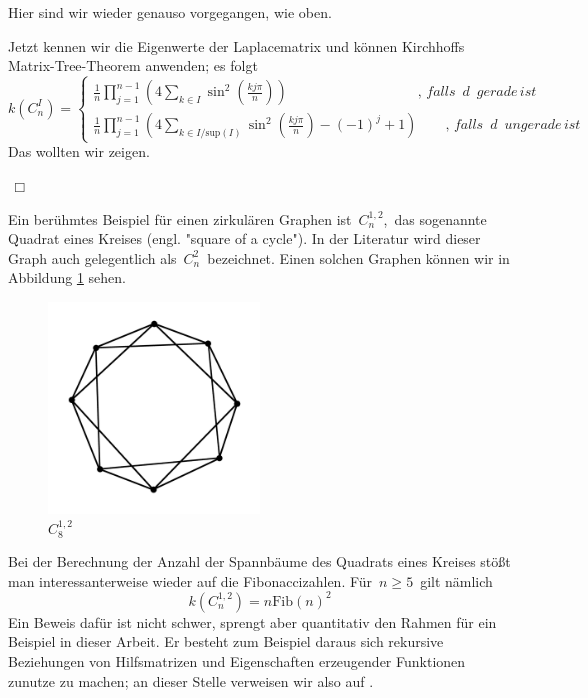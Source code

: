 \normalsize
Hier sind wir wieder genauso vorgegangen, wie oben.\\
\par
\endgroup
Jetzt kennen wir die Eigenwerte der Laplacematrix und können Kirchhoffs Matrix-Tree-Theorem anwenden; es folgt
\begin{equation*}
\mathit{k}\left( C_n^I \right) = 
 \begin{cases}
\frac{1}{n} \prod_{j=1}^{n-1} \left(4 \sum_{k \in I} \sin^2 \left( \frac{kj\pi}{n}\right) \right)\qquad\qquad\qquad\qquad\quad\; ,\,falls\,\,\,d\,\,\,gerade\,ist\\
\frac{1}{n} \prod_{j=1}^{n-1} \left(4 \sum_{k \in I/\mathrm{sup}(I)} \sin^2 \left( \frac{kj\pi}{n}\right)-(-1)^j+1\right)\qquad,\,falls\,\,\,d\,\,\,ungerade\,ist
\end{cases}
\end{equation*}
Das wollten wir zeigen.
\begin{flushright} $\,\Box\,$ \end{flushright} 
\begin{Bsps}
\end{Bsps}
Ein berühmtes Beispiel für einen zirkulären Graphen ist $\,C_n^{1,2}$,\, das sogenannte Quadrat eines Kreises (engl. "square of a cycle"). In der Literatur wird dieser Graph auch gelegentlich als $\,C_n^2\,$ bezeichnet. Einen solchen Graphen können wir in Abbildung \ref{c2_8} sehen.
\begin{figure}[H]
  \centering
 \includegraphics[width=0.5\textwidth]{c2_8.png}
 \caption{$C_8^{1,2}$}
 \label{c2_8} %
\end{figure}
Bei der Berechnung der Anzahl der Spannbäume des Quadrats eines Kreises stößt man interessanterweise wieder auf die Fibonaccizahlen. Für $\,n\geq5\,$ gilt nämlich
\begin{equation*}
 \mathit{k}\left(C_n^{1,2}\right)=n\mathrm{Fib}(n)^2
\end{equation*}
Ein Beweis dafür ist nicht schwer, sprengt aber quantitativ den Rahmen für ein Beispiel in dieser Arbeit. Er besteht zum Beispiel daraus sich rekursive Beziehungen von Hilfsmatrizen und Eigenschaften erzeugender Funktionen zunutze zu machen; an dieser Stelle verweisen wir also auf \cite{wang_yang_1984}.


